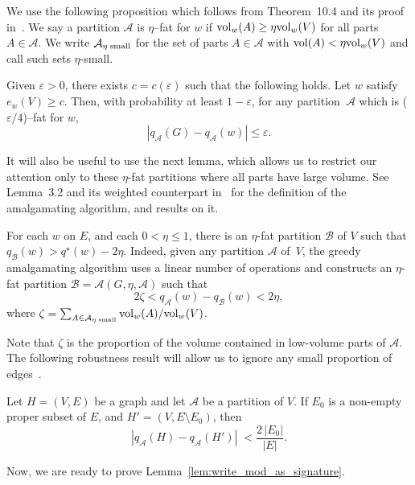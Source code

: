 \documentclass[a4paper,UKenglish,cleveref, autoref, thm-restate,numberwithinsect]{lipics-v2021}
\newcommand{\cA}{\mathcal{A}}
\newcommand{\cB}{\mathcal{B}}
\newcommand{\q}{q^{\star}}
\newcommand{\eps}{\varepsilon}
\newcommand{\vol}{{\rm vol}}
\begin{document}
\label{proof.concentration}
We use the following proposition which follows from Theorem~10.4 and its proof in~\cite{sampling}.
%
We say a partition $\cA$ is $\eta$--fat for $w$ if $\vol_w(A)\geq \eta \vol_w(V)$ for all parts $A \in \cA$. We write $\cA_{\eta\;  {\rm small}}$ for the set of parts $A\in\cA$ with $\vol(A)<\eta \vol_w(V)$ and call such sets $\eta$-small.%
%
\begin{proposition}%
\label{prop:from_sampling}
Given $\eps>0$, there exists $c=c(\eps)$ such that the following holds. Let $w$ satisfy $e_w(V)\geq c$. Then, with probability at least $1-\eps$, for any partition~$\cA$ which is ($\eps/4$)--fat for $w$,   
\[
|q_\cA(G)-q_\cA(w)| \leq \eps.
\]
\end{proposition}
It will also be useful to use the next lemma, 
which allows us to restrict our attention only to these $\eta$-fat partitions where all parts have large volume. See Lemma~3.2 and its weighted counterpart in~\cite{sampling} for the definition of the amalgamating algorithm, and results on it.   
\begin{lemma}\label{lem.fattening_w}
For each $w$ on $E$, and each $0<\eta \leq 1$, there is an $\eta$-fat partition $\cB$ of $V$ such that $q_{\cB}(w) > \q(w) - 2\eta$. Indeed, given any partition $\cA$ of~$V$, the greedy amalgamating algorithm uses a linear number of operations and constructs an $\eta$-fat partition $\cB =\cA(G,\eta,\cA)$ such that\[ 2\zeta < 
q_{\cA}(w) -  q_{\cB}(w) < 2\eta,\]
where $\zeta = \sum_{A\in \cA_{\eta \; \rm{small}}} \vol_w(A)/\vol_w(V)$. 
\end{lemma}

Note that $\zeta$ is the proportion of the volume contained in low-volume parts of $\cA$.
%
%
%
The following robustness result will allow us to ignore any small proportion of edges~\cite{sampling}.
%
\begin{lemma}\label{lem:robustness}
Let $H=(V,E)$ be a graph and let $\cA$ be a partition of $V$.
%
If $E_0$ is a non-empty proper subset of $E$, and $H'=(V, E \setminus E_0)$, then 
\[ |q_\cA(H)- q_\cA(H')| \; 
< \frac{2 \, |E_0|}{|E|}. \]
\end{lemma}

Now, we are ready to prove Lemma~\ref{lem:write_mod_as_signature}.
\end{document}

